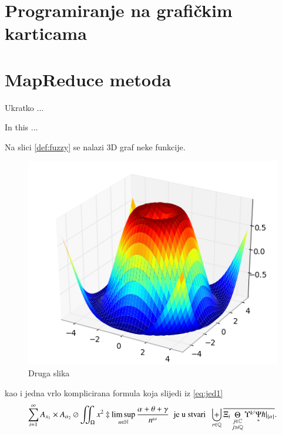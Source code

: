 \documentclass[a4paper,twoside,12pt]{memoir} %
\begin{document}
\section{Programiranje na grafičkim karticama}
\section{MapReduce metoda}



\pagestyle{empty} %


\begin{sazetak}
Ukratko ...
\end{sazetak}

\begin{summary}
In this ...
\end{summary}


\begin{cv}
Na slici \ref{def:fuzzy} se nalazi 3D graf neke funkcije. 

\begin{figure}[h!t]
\centering \includegraphics{surface3d.png}
\caption{Druga slika}
\label{fig:3d}
\end{figure}

kao i jedna vrlo komplicirana formula koja slijedi iz \eqref{eq:jed1}
\[ \sum_{i=1}^{\infty}A_{x_1}\times A_{{\alpha}_2}\oslash\iint_{\Omega}x^2\ddagger\limsup_{n\in\mathbb{N}}\frac{\alpha+\theta+\gamma}{n^{\omega}}\;\;\text{je u stvari}\;\;\biguplus_{r\in\mathbb{Q}}\overline{\Xi_i \mathop\Theta_{\substack{j\in\mathbb{C} \\ j\ni i\mathbb{Q}}} \Upsilon^{k^j} \underset{\ast}{\Psi} \hslash\vert_{\{\alpha\}}}.\]
\end{cv}
\end{document}
